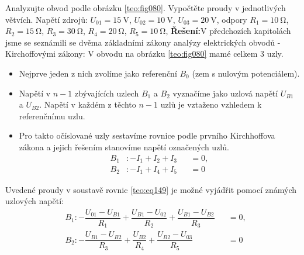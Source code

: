 \begin{mdframed}[style=mdexam]
  \begin{example}\label{TEO:exam020}
    Analyzujte obvod podle obrázku \ref{teo:fig080}. Vypočtěte proudy v jednotlivých větvích. Napětí
    zdrojů: \(U_{01} = \qty{15}{\V}\), \(U_{02} = \qty{10}{\V}\), \(U_{03} = \qty{20}{\V}\), odpory
    \(R_1 = \qty{10}{\ohm}\), \(R_2 = \qty{15}{\ohm}\), \(R_3 = \qty{30}{\ohm}\), \(R_4 =
    \qty{20}{\ohm}\), \(R_5 = \qty{10}{\ohm}\),
    \newline 
    \textbf{Řešení:}\newline V předchozích kapitolách jsme se seznámili se dvěma základními zákony
    analýzy elektrických obvodů - Kirchoffovými zákony: V obvodu na obrázku \ref{teo:fig080} mamé
    celkem 3 uzly. 
    \begin{itemize}[leftmargin=2em]
      \item Nejprve jeden z nich zvolíme jako referenční  \(B_0\) (zem s nulovým potenciálem). 
      \item Napětí v \(n-1\) zbývajících uzlech \(B_1\) a \(B_2\) vyznačíme jako uzlová napětí
            \(U_{B1}\) a \(U_{B2}\). Napětí v každém z těchto \(n-1\) uzlů je vztaženo vzhledem k
            referenčnímu uzlu. 
      \item Pro takto očíslované uzly sestavíme rovnice podle prvního Kirchhoffova zákona a jejich
            řešením stanovíme napětí označených uzlů.
            \begin{subequations}\label{teo:eq149}
              \begin{alignat}{2}
                B_1&: -I_1 + I_2 + I_3 &&=0,  \label{teo:eq149a}   \\
                B_2&: -I_1 + I_4 + I_5 &&=0   \label{teo:eq149b} 
              \end{alignat}
            \end{subequations}  
    \end{itemize}
    Uvedené proudy v soustavě rovnic \ref{teo:eq149} je možné vyjádřit pomocí známých uzlových
    napětí:
    \begin{subequations}\label{teo:eq150}
      \begin{alignat}{2}
        &B_1: - \dfrac{U_{01} - U_{B1}}{R_1} 
              + \dfrac{U_{B1} - U_{02}}{R_2} 
              + \dfrac{U_{B1} - U_{B2}}{R_3}       &&=0,  \label{teo:eq150a}   \\
        &B_2: - \dfrac{U_{B1} - U_{B2}}{R_3} 
              + \dfrac{U_{B2}}{R_4}
              + \dfrac{U_{B2} - U_{03}}{R_5}       &&=0   \label{teo:eq150b} 

\end{alignat}
\end{subequations}
\end{example}
\end{mdframed}
